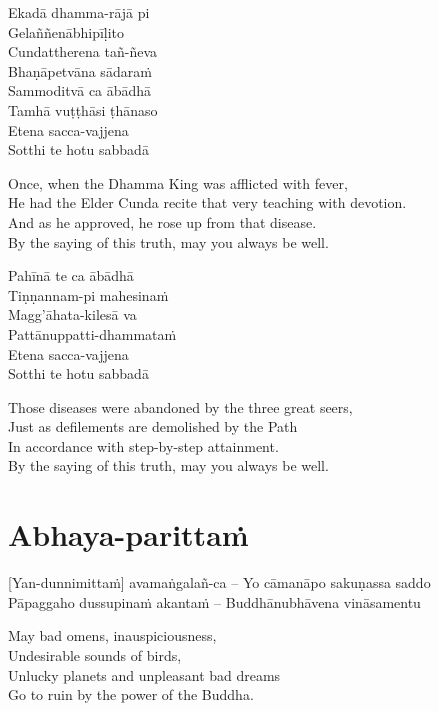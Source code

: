 Ekadā dhamma-rājā pi\\
Gelaññenābhipīḷito\\
Cundattherena tañ-ñeva\\
Bhaṇāpetvāna sādaraṁ\\
Sammoditvā ca ābādhā\\
Tamhā vuṭṭhāsi ṭhānaso\\
Etena sacca-vajjena\\
Sotthi te hotu sabbadā

\begin{english-verses}
  Once, when the Dhamma King was afflicted with fever,\\
  He had the Elder Cunda recite that very teaching with devotion.\\
  And as he approved, he rose up from that disease.\\
  By the saying of this truth, may you always be well.
\end{english-verses}

Pahīnā te ca ābādhā\\
Tiṇṇannam-pi mahesinaṁ\\
Magg'āhata-kilesā va\\
Pattānuppatti-dhammataṁ\\
Etena sacca-vajjena\\
Sotthi te hotu sabbadā

\begin{english-verses}
  Those diseases were abandoned by the three great seers,\\
  Just as defilements are demolished by the Path\\
  In accordance with step-by-step attainment.\\
  By the saying of this truth, may you always be well.
\end{english-verses}

\suttaRef{[Thai]}

\section{Abhaya-parittaṁ}
\label{abhaya-parittam}

\vspace{-1em}

[Yan-dunnimittaṁ] avamaṅgalañ-ca – Yo cāmanāpo sakuṇassa saddo\\
Pāpaggaho dussupinaṁ akantaṁ – Buddhānubhāvena vināsamentu

\begin{english-verses}
  May bad omens, inauspiciousness,\\
  Undesirable sounds of birds,\\
  Unlucky planets and unpleasant bad dreams\\
  Go to ruin by the power of the Buddha.
\end{english-verses}

